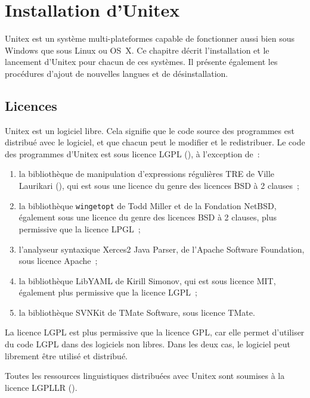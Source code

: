 \chapter{Installation d'Unitex}
\label{chap-install}

Unitex est un système multi-plateformes capable de fonctionner aussi bien sous
Windows que sous Linux ou OS~X. Ce chapitre décrit l’installation et le lancement d’Unitex
pour chacun de ces systèmes. Il présente également les procédures d’ajout de nouvelles
langues et de désinstallation.

\section{Licences}
\label{section-licences}
Unitex est un logiciel libre. Cela signifie que le code source des programmes est distribué avec le
logiciel, et que chacun peut le modifier et le redistribuer. Le code des programmes d’Unitex est
sous licence LGPL (\cite{LGPL}), à l’exception de~:

\begin{enumerate}
\item la bibliothèque de manipulation d’expressions régulières TRE de Ville Laurikari (\cite{TRE}),
qui est sous une licence du genre des licences BSD à 2 clauses~;

\item la bibliothèque \verb+wingetopt+ de Todd Miller et de la Fondation NetBSD, également sous une licence
 du genre des licences BSD à 2 clauses, plus permissive que la licence LPGL~;

\item l'analyseur syntaxique Xerces2 Java Parser, de l'Apache Software Foundation, sous licence Apache~;

\item  la bibliothèque LibYAML de Kirill Simonov, qui est sous licence MIT, également plus permissive que la licence LGPL~;

\item la bibliothèque SVNKit de TMate Software, sous licence TMate.
\end{enumerate}

\noindent La licence LGPL est plus permissive que la licence GPL, car elle permet d’utiliser du code LGPL dans
des logiciels non libres. Dans les deux cas, le logiciel peut librement être utilisé et distribué.


\bigskip
\noindent Toutes les ressources linguistiques distribuées avec Unitex sont soumises à la licence LGPLLR
 (\cite{LGPLLR}).

